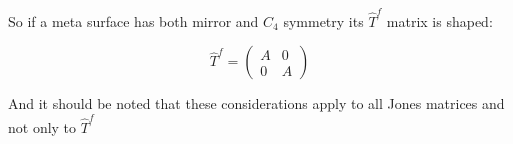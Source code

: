 So if a meta surface has both mirror and $C_4$ symmetry its $\hat T^f$ matrix is shaped:

\begin{equation}
    \hat T^f =
    \begin{pmatrix}
        A & 0 \\
        0 & A
    \end{pmatrix}
\end{equation}

And it should be noted that these considerations apply to all Jones matrices and not only to $\hat T^f$
